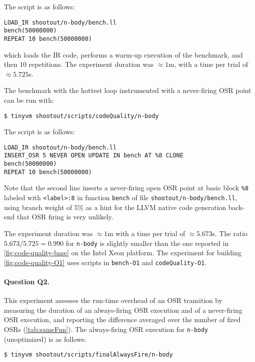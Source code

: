 \noindent The script is as follows:

\begin{small}
\begin{verbatim}
LOAD_IR shootout/n-body/bench.ll
bench(50000000)
REPEAT 10 bench(50000000)
\end{verbatim}
\end{small}

\noindent which loads the IR code, performs a warm-up execution of the benchmark, and then 10 repetitions. The experiment duration was $\approx1$m, with a time per trial of $\approx5.725$s. 

The benchmark with the hottest loop instrumented with a never-firing OSR point can be run with:

\begin{small}
\begin{verbatim}
$ tinyvm shootout/scripts/codeQuality/n-body
\end{verbatim}
\end{small}

\noindent The script is as follows:

\begin{small}
\begin{verbatim}
LOAD_IR shootout/n-body/bench.ll
INSERT_OSR 5 NEVER OPEN UPDATE IN bench AT %8 CLONE
bench(50000000)
REPEAT 10 bench(50000000)
\end{verbatim}
\end{small}

\noindent Note that the second line inserts a never-firing open OSR point at basic block {\tt \%8} labeled with {\tt <label>:8} in function {\tt bench} of file {\tt shootout/n-body/bench.ll}, using branch weight of 5\% as a hint for the LLVM native code generation back-end that OSR firing is very unlikely. 

The experiment duration was $\approx1$m with a time per trial of $\approx5.673$s. The ratio $5.673/5.725=0.990$ for {\tt n-body} is slightly smaller than the one reported in \ref{fig:code-quality-base} on the Intel Xeon platform. The experiment for building \ref{fig:code-quality-O1} uses scripts in {\tt bench-O1} and {\tt codeQuality-O1}.

\paragraph{Question Q2.} This experiment assesses the run-time overhead of an OSR transition by measuring the duration of an always-firing OSR execution and of a never-firing OSR execution, and reporting the difference averaged over the number of fired OSRs (\mytable\ref{tab:sameFun}). The always-firing OSR execution for {\tt n-body} (unoptimized) is as follows:
\begin{small}
\begin{verbatim}
$ tinyvm shootout/scripts/finalAlwaysFire/n-body
\end{verbatim}
\end{small}

